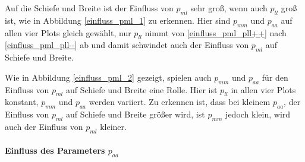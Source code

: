 Auf die Schiefe und Breite ist der Einfluss von $p_{ml}$ sehr groß, wenn auch $p_{ll}$ groß ist, wie in Abbildung \ref{einfluss_pml_1} zu erkennen. Hier sind $p_{mm}$ und $p_{aa}$ auf allen vier Plots gleich gewählt, nur $p_{ll}$ nimmt von \ref{einfluss_pml_pll++} nach \ref{einfluss_pml_pll--} ab und damit schwindet auch der Einfluss von $p_{ml}$ auf Schiefe und Breite.

Wie in Abbildung \ref{einfluss_pml_2} gezeigt, spielen auch $p_{mm}$ und $p_{aa}$ für den Einfluss von $p_{ml}$ auf Schiefe und Breite eine Rolle. Hier ist $p_{ll}$ in allen vier Plots konstant, $p_{mm}$ und $p_{aa}$ werden variiert. Zu erkennen ist, dass bei kleinem $p_{aa}$, der Einfluss von $p_{ml}$ auf Schiefe und Breite größer wird, ist $p_{mm}$ jedoch klein, wird auch der Einfluss von $p_{ml}$ kleiner.


\paragraph*{Einfluss des Parameters $p_{aa}$}

